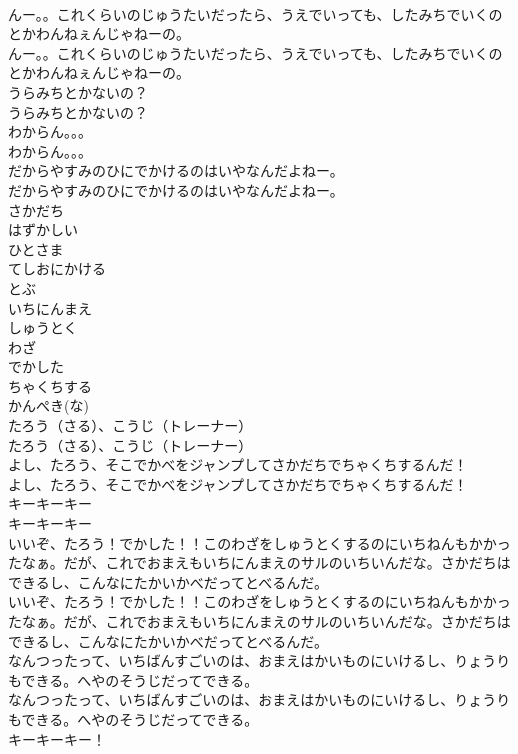 \documentclass[8pt]{extreport}
\begin{document}
\begin{CJK}{UTF8}{min}
\\	んー。。これくらいのじゅうたいだったら、うえでいっても、したみちでいくのとかわんねぇんじゃねーの。
\\	んー。。これくらいのじゅうたいだったら、うえでいっても、したみちでいくのとかわんねぇんじゃねーの。
\\	うらみちとかないの？
\\	うらみちとかないの？
\\	わからん。。。
\\	わからん。。。
\\	だからやすみのひにでかけるのはいやなんだよねー。
\\	だからやすみのひにでかけるのはいやなんだよねー。
\\	さかだち
\\	はずかしい
\\	ひとさま
\\	てしおにかける
\\	とぶ
\\	いちにんまえ
\\	しゅうとく
\\	わざ
\\	でかした
\\	ちゃくちする
\\	かんぺき(な)
\\	たろう（さる）、こうじ（トレーナー）
\\	たろう（さる）、こうじ（トレーナー）
\\	よし、たろう、そこでかべをジャンプしてさかだちでちゃくちするんだ！
\\	よし、たろう、そこでかべをジャンプしてさかだちでちゃくちするんだ！
\\	キーキーキー
\\	キーキーキー
\\	いいぞ、たろう！でかした！！このわざをしゅうとくするのにいちねんもかかったなぁ。だが、これでおまえもいちにんまえのサルのいちいんだな。さかだちはできるし、こんなにたかいかべだってとべるんだ。
\\	いいぞ、たろう！でかした！！このわざをしゅうとくするのにいちねんもかかったなぁ。だが、これでおまえもいちにんまえのサルのいちいんだな。さかだちはできるし、こんなにたかいかべだってとべるんだ。
\\	なんつったって、いちばんすごいのは、おまえはかいものにいけるし、りょうりもできる。へやのそうじだってできる。
\\	なんつったって、いちばんすごいのは、おまえはかいものにいけるし、りょうりもできる。へやのそうじだってできる。
\\	キーキーキー！

\end{CJK}
\end{document}
